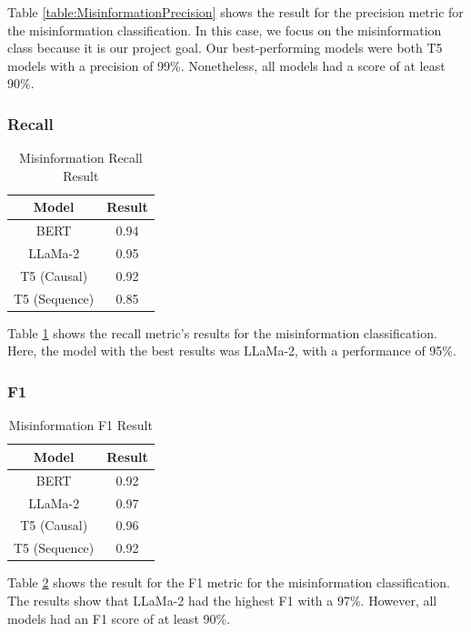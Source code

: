 Table \ref{table:MisinformationPrecision} shows the result for the precision metric for the misinformation classification. In this case, we focus on the misinformation
class because it is our project goal. Our best-performing models were both T5 models with a precision of 99\%. Nonetheless, all models had a score of at least 90\%.

\subsubsection{Recall}
\begin{table}[!htb]
	\centering
	\caption{Misinformation Recall Result}
	{
	\begin{tabular}{||c | c||} 
		\hline
		\textbf{Model} & \textbf{Result} \\ 
		\hline
		BERT & 0.94  \\
		\hline
		LLaMa-2 & 0.95 \\ 
		\hline
		T5 (Causal) & 0.92 \\
		\hline
		T5 (Sequence) & 0.85 \\
		\hline
	\end{tabular}
	}
	\label{table:MisinformationRecall}
\end{table}

Table \ref{table:MisinformationRecall} shows the recall metric's results for the misinformation classification. 
Here, the model with the best results was LLaMa-2,
with a performance of 95\%. 

\subsubsection{F1}
\begin{table}[!htb]
	\centering
	\caption{Misinformation F1 Result}
	{
	\begin{tabular}{||c | c||} 
		\hline
		\textbf{Model} & \textbf{Result} \\  
		\hline
		BERT & 0.92  \\
		\hline
		LLaMa-2 & 0.97 \\ 
		\hline
		T5 (Causal) & 0.96 \\
		\hline
		T5 (Sequence) & 0.92 \\
		\hline
	\end{tabular}
	}
	\label{table:MisinformationF1}
\end{table}

Table \ref{table:MisinformationF1}  shows the result for the F1 metric for the misinformation classification. The results show that LLaMa-2 had the highest F1 with a 97\%.
However, all models had an F1 score of at least 90\%.

